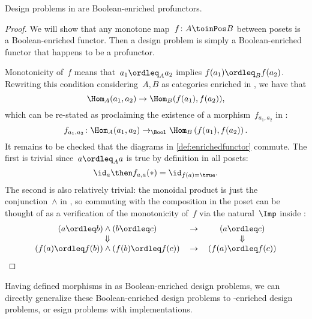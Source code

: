 \begin{proposition}
  Design problems in \DP are Boolean-enriched profunctors.
\end{proposition}
\begin{proof}
  We will show that any monotone map~$f\colon A \toinPos B$ between posets is a Boolean-enriched functor. Then a design problem is simply a Boolean-enriched functor that happens to be a profunctor.

  Monotonicity of~$f$ means that~$a_1 \ordleq_A a_2$ implies $f(a_1) \ordleq_B f(a_2)$. Rewriting this condition considering~$A, B$ as categories enriched in \Bool, we have that
  \begin{equation*}
    \Hom_A(a_1, a_2) \to \Hom_B(f(a_1), f(a_2)),
  \end{equation*}
  which can be re-stated as proclaiming the existence of a morphism~$f_{a_1, a_2}$ in \Bool:
  \begin{equation*}
    f_{a_1, a_2} \colon \Hom_A(a_1, a_2) \to_{\Bool} \Hom_B\left(f(a_1), f(a_2)\right).
  \end{equation*}
  It remains to be checked that the diagrams in \cref{def:enrichedfunctor} commute. The first is trivial since~$a \ordleq_A a$ is true by definition in all posets:
  \begin{equation*}
    \id_{a} \then f_{a,a} (\ast) = \id_{f(a) = \true}.
  \end{equation*}
  The second is also relatively trivial: the monoidal product is just the conjunction~$\wedge$ in \Bool, so commuting with the composition in the poset can be thought of as a verification of the monotonicity of~$f$ via the natural~$\Imp$ inside \Bool:
  \begin{equation*}
    \begin{tabular}{ccc}
      $(a \ordleq b) \wedge (b \ordleq c)$             & $\to$ & $(a \ordleq c)$       \\
      $\Downarrow$                                     &       & $\Downarrow$          \\
      $(f(a) \ordleq f(b)) \wedge (f(b) \ordleq f(c))$ & $\to$ & $(f(a) \ordleq f(c))$
    \end{tabular}
  \end{equation*}
\end{proof}

Having defined morphisms in \DP as Boolean-enriched design problems, we can directly generalize these Boolean-enriched design problems to \Set-enriched design problems, or esign problems with implementations.

